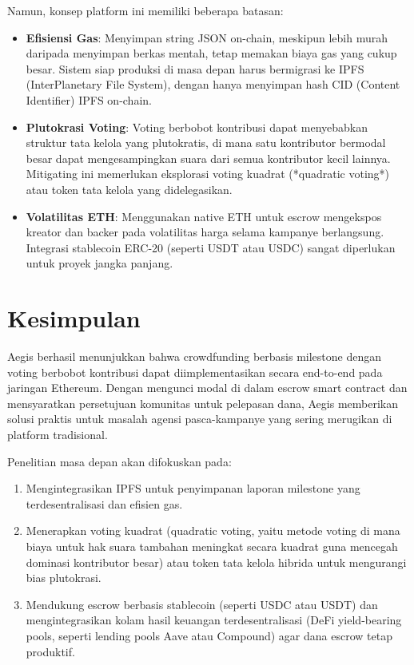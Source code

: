 \documentclass[conference]{IEEEtran}
\begin{document}
Namun, konsep platform ini memiliki beberapa batasan:
\begin{itemize}
	\item \textbf{Efisiensi Gas}: Menyimpan string JSON on-chain, meskipun lebih murah daripada menyimpan berkas mentah, tetap memakan biaya gas yang cukup besar. Sistem siap produksi di masa depan harus bermigrasi ke IPFS (InterPlanetary File System), dengan hanya menyimpan hash CID (Content Identifier) IPFS on-chain.
	\item \textbf{Plutokrasi Voting}: Voting berbobot kontribusi dapat menyebabkan struktur tata kelola yang plutokratis, di mana satu kontributor bermodal besar dapat mengesampingkan suara dari semua kontributor kecil lainnya. Mitigating ini memerlukan eksplorasi voting kuadrat (*quadratic voting*) atau token tata kelola yang didelegasikan.
	\item \textbf{Volatilitas ETH}: Menggunakan native ETH untuk escrow mengekspos kreator dan backer pada volatilitas harga selama kampanye berlangsung. Integrasi stablecoin ERC-20 (seperti USDT atau USDC) sangat diperlukan untuk proyek jangka panjang.
\end{itemize}

\section{Kesimpulan}
Aegis berhasil menunjukkan bahwa crowdfunding berbasis milestone dengan voting berbobot kontribusi dapat diimplementasikan secara end-to-end pada jaringan Ethereum. Dengan mengunci modal di dalam escrow smart contract dan mensyaratkan persetujuan komunitas untuk pelepasan dana, Aegis memberikan solusi praktis untuk masalah agensi pasca-kampanye yang sering merugikan di platform tradisional.

Penelitian masa depan akan difokuskan pada:
\begin{enumerate}
	\item Mengintegrasikan IPFS untuk penyimpanan laporan milestone yang terdesentralisasi dan efisien gas.
	\item Menerapkan voting kuadrat (quadratic voting, yaitu metode voting di mana biaya untuk hak suara tambahan meningkat secara kuadrat guna mencegah dominasi kontributor besar) atau token tata kelola hibrida untuk mengurangi bias plutokrasi.
	\item Mendukung escrow berbasis stablecoin (seperti USDC atau USDT) dan mengintegrasikan kolam hasil keuangan terdesentralisasi (DeFi yield-bearing pools, seperti lending pools Aave atau Compound) agar dana escrow tetap produktif.
\end{enumerate}
\end{document}
